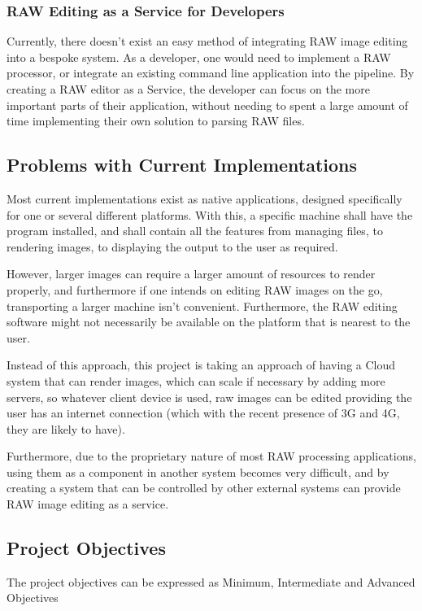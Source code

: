 \documentclass[10pt,a4paper]{article}
\begin{document}
\subsubsection{RAW Editing as a Service for Developers}
Currently, there doesn't exist an easy method of integrating RAW image editing into a bespoke system. As a developer, one would need to implement
a RAW processor, or integrate an existing command line application into the pipeline. By creating a RAW editor as a Service, the developer can focus
on the more important parts of their application, without needing to spent a large amount of time implementing their own solution to parsing RAW files.

\subsection{Problems with Current Implementations}
Most current implementations exist as native applications, designed specifically for one or several different platforms.
With this, a specific machine shall have the program installed, and shall contain all the features from managing files, to
rendering images, to displaying the output to the user as required. 

However, larger images can require a larger amount of resources to render properly, and furthermore if one intends on editing RAW images
on the go, transporting a larger machine isn't convenient. Furthermore, the RAW editing software might not necessarily be available on the platform
that is nearest to the user. 

Instead of this approach, this project is taking an approach of having a Cloud system that can render images, which can scale if necessary by adding more
servers, so whatever client device is used, raw images can be edited providing the user has an internet connection (which with the recent presence of 3G and 4G,
they are likely to have).

Furthermore, due to the proprietary nature of most RAW processing applications, using them as a component in another system becomes very difficult,
and by creating a system that can be controlled by other external systems can provide RAW image editing as a service.

\subsection{Project Objectives}
The project objectives can be expressed as Minimum, Intermediate and Advanced Objectives
\end{document}
